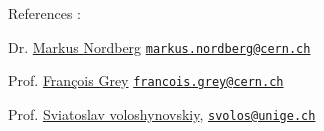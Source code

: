 \documentclass[a4paper,12pt]{article}
\begin{document}
\begin{center}
    

{\fontsize{10}{10}\selectfont \quad References : 

Dr. \href{https://nordberg.web.cern.ch/nordberg/}{{\color{blue} Markus Nordberg}} \href{mailto:svolos@unige.ch}{\nolinkurl{markus.nordberg@cern.ch}}

Prof. \href{http://cui.unige.ch/~grey/}{{\color{blue}François Grey}}
\href{mailto:francois.grey@cern.ch }{\nolinkurl{francois.grey@cern.ch}}}

Prof. \href{http://sip.unige.ch/team/prof-sviatoslav-voloshynovskiy/}{{\color{blue}Sviatoslav voloshynovskiy}},
\href{mailto:svolos@unige.ch}{\nolinkurl{svolos@unige.ch}}
\end{center}
\end{document}
